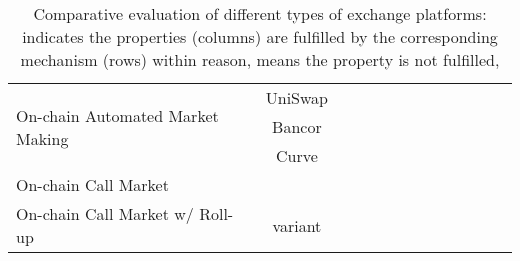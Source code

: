 \begin{table*}[t]
\begin{tabular}{|l|c|p{0.4cm}|p{0.4cm}|p{0.4cm}|p{0.4cm}|p{0.4cm}|p{0.4cm}|p{0.4cm}|p{0.4cm}|p{0.4cm}|p{0.4cm}|p{0.4cm}|}
\multirow{3}{*}{On-chain Automated Market Making}	&UniSwap	&\multirow{3}{*}{\full}		&\multirow{3}{*}{\full }		&\multirow{3}{*}{ \full}		&\multirow{3}{*}{}		&\multirow{3}{*}{ \full}		&\multirow{3}{*}{} 		&\multirow{3}{*}{ }		&\multirow{3}{*}{ \full}		&\multirow{3}{*}{ }		&\multirow{3}{*}{ }		&\multirow{3}{*}{ \full} 		\\ 
							                      	&Bancor	& 						&						&						&						&						&						&						&						&						& 						&						\\
										&Curve     	& 						&						&						&						&						&						&						&						&						& 						&						\\ \hline			

\multirow{1}{*}{On-chain Call Market}    			&\cm			&\multirow{1}{*}{\full}		&\multirow{1}{*}{\full}		&\multirow{1}{*}{\full}		&\multirow{1}{*}{\full}		&\multirow{1}{*}{\full}		&\multirow{1}{*}{} 		&\multirow{1}{*}{}		&\multirow{1}{*}{}		&\multirow{1}{*}{\full}		&\multirow{1}{*}{ \full}		&\multirow{1}{*}{\full } 		\\ \hline

\multirow{1}{*}{On-chain Call Market w/ Roll-up}	&\cm	 variant	&\multirow{1}{*}{\full}		&\multirow{1}{*}{\full}		&\multirow{1}{*}{}		&\multirow{1}{*}{\full}		&\multirow{1}{*}{}		&\multirow{1}{*}{\prt} 		&\multirow{1}{*}{\prt}		&\multirow{1}{*}{}		&\multirow{1}{*}{\full}		&\multirow{1}{*}{ \full}		&\multirow{1}{*}{\full } 		\\ \hline


\hline


\end{tabular}
\caption{\footnotesize{Comparative evaluation of different types of exchange platforms: {\full} indicates the properties (columns) are fulfilled by the corresponding mechanism (rows) within reason, {\prt} means the property is not fulfilled, }
\label{tab:eval}}
\end{table*}

	